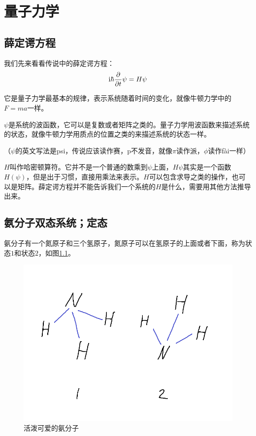 \chapter{量子力学}
\section{薛定谔方程}
我们先来看看传说中的薛定谔方程：
\begin{equation*}
\mathrm{i} \hbar \frac{\partial}{\partial t} \psi=H \psi
\end{equation*}

它是量子力学最基本的规律，表示系统随着时间的变化，就像牛顿力学中的$F=m a$一样。

$\psi$是系统的波函数，它可以是复数或者矩阵之类的。量子力学用波函数来描述系统的状态，就像牛顿力学用质点的位置之类的来描述系统的状态一样。

（$\psi$的英文写法是psi，传说应该读作赛，p不发音，就像$\pi$读作派，$\phi$读作fài一样）

$H$叫作哈密顿算符。它并不是一个普通的数乘到$\psi$上面，$H \psi$其实是一个函数$H(\psi)$，但是出于习惯，直接用乘法来表示。$H$可以包含求导之类的操作，也可以是矩阵。薛定谔方程并不能告诉我们一个系统的$H$是什么，需要用其他方法推导出来。
\section{氨分子双态系统；定态}
氨分子有一个氮原子和三个氢原子，氮原子可以在氢原子的上面或者下面，称为状态$1$和状态$2$，如图\ref{fig-ammonia}。
\begin{figure}[htb]
\centering
\includegraphics[scale=0.5]{fig/ammonia.png}
\caption{活泼可爱的氨分子}
\label{fig-ammonia}
\end{figure}

